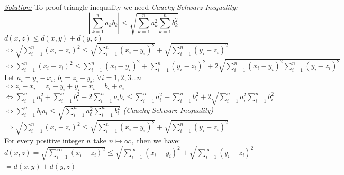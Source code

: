 \documentclass{book}
\begin{document}


\begin{tcolorbox}[enhanced,attach boxed title to top center={yshift=-3mm,yshifttext=-1mm},
colback=blue!5!white,colframe=blue!75!black,colbacktitle=red!80!black,
title={$(\mathbb{L}^n,d)$ is a metric space, $d=\sqrt{\sum_{i=1}^{\infty}(x_i-y_i)^2}:$:},fonttitle=\bfseries,
boxed title style={size=small,colframe=red!50!black} ]
\textit{\color{blue}\underline{Solution:}}
To proof triangle inequality we need \textit{\color{blue}Cauchy-Schwarz	Inequality:}\\
{$$\left |\sum_{k=1}^{n}a_k b_k \right |\leq \sqrt{\sum_{k=1}^{n}a_k^2 \sum_{k=1}^{n}b_k^2}$$}
$d(x,z)\leq d(x,y)+d(y,z)$\\
$\Leftrightarrow \sqrt{\sum_{i=1}^{n}(x_i-z_i)^2}\leq 
\sqrt{\sum_{i=1}^{n}(x_i-y_i)^2}+\sqrt{\sum_{i=1}^{n}(y_i-z_i)^2}$\\
$\Leftrightarrow \sum_{i=1}^{n}(x_i-z_i)^2\leq 
\sum_{i=1}^{n}(x_i-y_i)^2+\sum_{i=1}^{n}(y_i-z_i)^2+2\sqrt{\sum_{i=1}^{n}(x_i-y_i)^2\sum_{i=1}^{n}(y_i-z_i)^2}$\\
Let $a_i=y_i-x_i$,  $b_i=z_i-y_i$, $\forall i=1,2,3...n$\\
$\Leftrightarrow z_i-x_i=z_i-y_i+y_i-x_i=b_i+a_i$\\
$\Leftrightarrow \sum_{i=1}^{n}a_i^2+ \sum_{i=1}^{n}b_i^2+2\sum_{i=1}^{n}a_i b_i\leq 
\sum_{i=1}^{n}a_i^2+\sum_{i=1}^{n}b_i^2+2\sqrt{\sum_{i=1}^{n}a_i^2\sum_{i=1}^{n} b_i^2}$
$\Leftrightarrow \sum_{i=1}^{n}b_i a_i\leq \sqrt{\sum_{i=1}^{n}a_i^2\sum_{i=1}^{n} b_i^2}$ 
\textit{\color{blue}(Cauchy-Schwarz Inequality)}\\
$\Rightarrow\sqrt{\sum_{i=1}^{n}(x_i-z_i)^2}\leq 
\sqrt{\sum_{i=1}^{n}(x_i-y_i)^2}+\sqrt{\sum_{i=1}^{n}(y_i-z_i)^2}$\\
For every positive integer $n$ take $n\mapsto\infty,$ then we have:\\
$d(x,z)=\sqrt{\sum_{i=1}^{\infty}(x_i-z_i)^2}\leq
\sqrt{\sum_{i=1}^{\infty}(x_i-y_i)^2}+\sqrt{\sum_{i=1}^{\infty}(y_i-z_i)^2}$\\
$=d(x,y)+d(y,z)$\
\end{tcolorbox}

\end{document}
